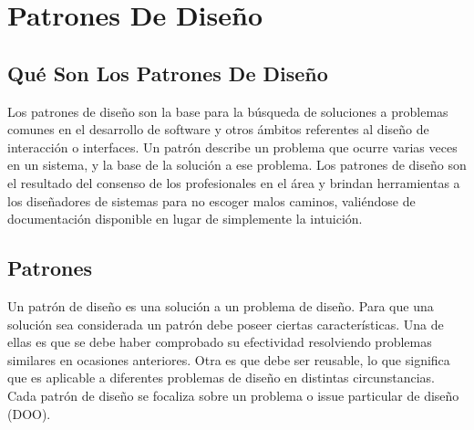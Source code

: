 \chapter{Patrones De Diseño}
	\section{Qué Son Los Patrones De Diseño}
Los patrones de diseño son la base para la búsqueda de soluciones a problemas comunes en el desarrollo de software y
otros ámbitos referentes al diseño de interacción o interfaces. Un patrón describe un problema que ocurre varias
veces en un sistema, y la base de la solución a ese problema. Los patrones de diseño son el resultado del consenso de
los profesionales en el área y brindan herramientas a los diseñadores de sistemas para no escoger malos caminos,
valiéndose de documentación disponible en lugar de simplemente la intuición.

    \section{Patrones}
Un patrón de diseño es una solución a un problema de diseño. Para que una solución sea considerada un
patrón debe poseer ciertas características. Una de ellas es que se debe haber comprobado su efectividad resolviendo
problemas similares en ocasiones anteriores. Otra es que debe ser reusable, lo que significa que es aplicable a
diferentes problemas de diseño en distintas circunstancias. Cada patrón de diseño se focaliza sobre un problema o issue
particular de diseño (DOO).

